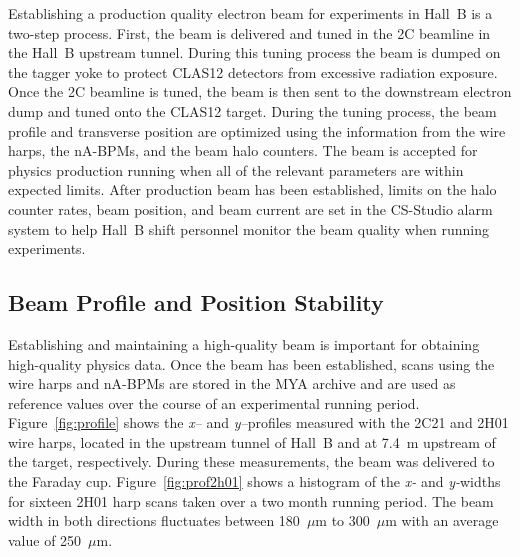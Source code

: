 Establishing a production quality electron beam for experiments in Hall~B is a two-step process. First, the beam is
delivered and tuned in the 2C beamline in the Hall~B upstream tunnel. During this tuning process the beam is dumped
on the tagger yoke to protect CLAS12 detectors from excessive radiation exposure. Once the 2C beamline is tuned,
the beam is then sent to the downstream electron dump and tuned onto the CLAS12 target. During the tuning process,
the beam profile and transverse position are optimized using the information from the wire harps, the nA-BPMs, and
the beam halo counters. The beam is accepted for physics production running when all of the relevant parameters are
within expected limits. After production beam has been established,  limits on the halo counter rates, beam position,
and beam current are set in the CS-Studio alarm system to help Hall~B shift personnel monitor the beam quality
when running experiments.  

\subsection{Beam Profile and Position Stability}

Establishing and maintaining a high-quality beam is important for obtaining high-quality physics data. Once the beam
has been established, scans using the wire harps and nA-BPMs are stored in the MYA archive and are used as
reference values over the course of an experimental running period. Figure~\ref{fig:profile}  shows the {\it x--}
and {\it y--}profiles measured with the 2C21 and 2H01 wire harps, located in the upstream tunnel of Hall~B and
at 7.4~m upstream of the target, respectively. During these measurements, the beam was delivered to the Faraday
cup. Figure~\ref{fig:prof2h01} shows a histogram of the {\it x-} and {\it y-}widths for sixteen 2H01 harp scans
taken over a two month running period.  The beam width in both directions fluctuates between 180~$\mu$m to
300~$\mu$m with an average value of 250~$\mu$m. 

